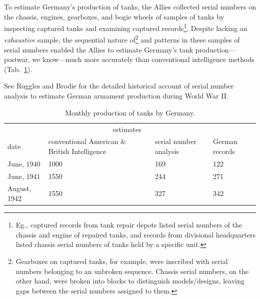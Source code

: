 \documentclass[11pt, oneside]{article}
\begin{document}
To estimate Germany's production of tanks, the Allies collected serial numbers on the chassis, engines, gearboxes, and bogie wheels of samples of tanks by inspecting captured tanks and examining captured records\footnote{Eg., captured records from tank repair depots listed serial numbers of the chassis and engine of repaired tanks, and records from divisional headquarters listed chassis serial numbers of tanks held by a specific unit.}. 
Despite lacking an \emph{exhaustive} sample, the sequential nature of\footnote{
Gearboxes on captured tanks, for example, were inscribed with serial numbers belonging to an unbroken sequence. Chassis serial numbers, on the other hand, were broken into blocks to distinguish models/designs, leaving gaps between the serial numbers assigned to them.
} and patterns in these samples of serial numbers enabled the Allies to estimate Germany's tank production---postwar, we know---much more accurately than conventional intelligence methods (Tab.~\ref{tab:success}).

See Ruggles and Brodie \cite{ruggles1947empirical} for the detailed historical account of serial number analysis to estimate German armament production during World War II.


\begin{table}[h!]
\centering 
\caption{Monthly production of tanks by Germany. \cite{ruggles1947empirical}} \label{tab:success}
\begin{tabular}{p{2.5cm} p{4cm} p{4cm} p{2cm}}
\toprule
 & \multicolumn{2}{c}{estimates} &   \\ 
\cmidrule(r){2-3}
date & conventional American \& British Intelligence & serial number analysis  & German records \\
\midrule
June, 1940 & 1000& 169 &  122 \\
June, 1941 &1550 & 244 &   271 \\
August, 1942 & 1550& 327  & 342 \\
\bottomrule
\end{tabular}
\end{table}
\end{document}
